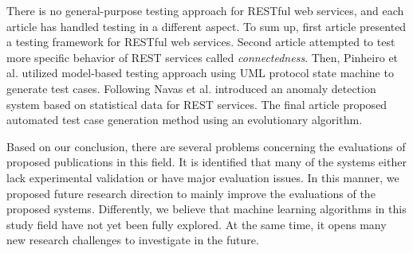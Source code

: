 \documentclass[english]{tktltiki}
\begin{document}
There is no general-purpose testing approach for RESTful web services, and each article has handled testing in a different aspect. To sum up, first article \cite{chakrabarti2010connectedness} presented a testing framework for RESTful web services. Second article \cite{chakrabarti2010connectedness} attempted to test more specific behavior of REST services called \textit{connectedness}. Then, Pinheiro et al. \cite{pinheiro2013model} utilized model-based testing approach using UML protocol state machine to generate test cases. Following Navas et al. \cite{navas2014rest} introduced an anomaly detection system based on statistical data for REST services. The final article \cite{arcuri2017restful} proposed automated test case generation method using an evolutionary algorithm.

Based on our conclusion, there are several problems concerning the evaluations of proposed publications in this field. It is identified that many of the systems either lack experimental validation or have major evaluation issues. In this manner, we proposed future research direction to mainly improve the evaluations of the proposed systems. Differently, we believe that machine learning algorithms in this study field have not yet been fully explored. At the same time, it opens many new research challenges to investigate in the future.
\newpage
\nocite{*}
%
%


%



\lastpage
\end{document}
